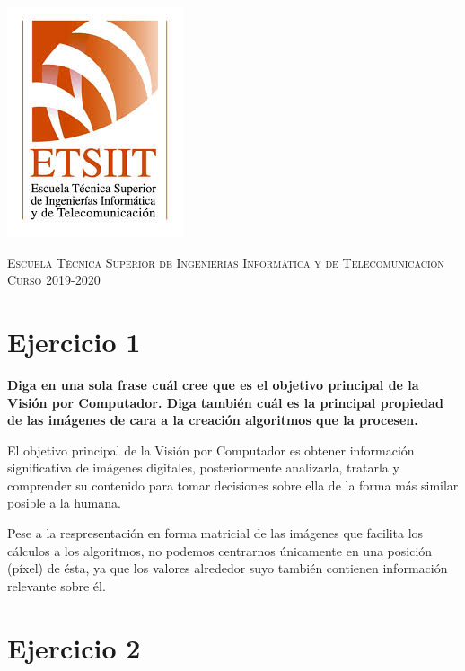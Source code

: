 \documentclass[11pt,a4paper]{article}
\begin{document}
\begin{titlepage}
\begin{minipage}{\textwidth}
\includegraphics[scale=0.3]{img/etsiit.jpeg}

\vspace{0.7cm}
\textsc{Escuela Técnica Superior de Ingenierías Informática y de Telecomunicación}\\
\vspace{1cm}
\textsc{Curso 2019-2020}
\end{minipage}
\end{titlepage}

\tableofcontents
\thispagestyle{empty}				%

\newpage

\setlength{\parskip}{1em}


\section*{Ejercicio 1}

\textbf{Diga en una sola frase cuál cree que es el objetivo principal de la Visión por Computador. Diga también cuál
es la principal propiedad de las imágenes de cara a la creación algoritmos que la procesen.}

El objetivo principal de la Visión por Computador es obtener información significativa de imágenes digitales, posteriormente
analizarla, tratarla y comprender su contenido para tomar decisiones sobre ella de la forma más similar posible a la humana.

Pese a la respresentación en forma matricial de las imágenes que facilita los cálculos a los algoritmos, no podemos centrarnos
únicamente en una posición (píxel) de ésta, ya que los valores alrededor suyo también contienen información relevante sobre él.


\section*{Ejercicio 2}
\end{document}
